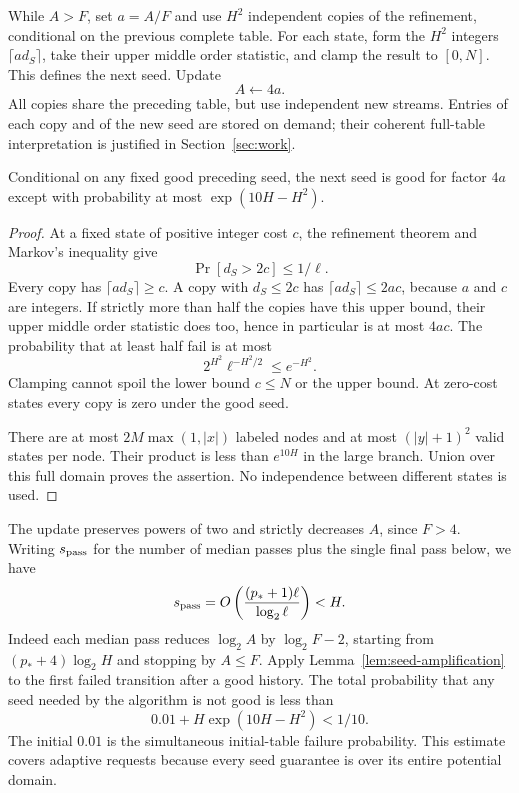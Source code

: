 While $A>F$, set $a=A/F$ and use $H^2$ independent copies of the
refinement, conditional on the previous complete table. For each state,
form the $H^2$ integers $\lceil a d_S\rceil$, take their upper middle
order statistic, and clamp the result to $[0,N]$. This defines the next
seed. Update
\begin{equation}\label{eq:seed-factor-update}
 A\longleftarrow4a.
\end{equation}
All copies share the preceding table, but use independent new streams.
Entries of each copy and of the new seed are stored on demand; their
coherent full-table interpretation is justified in Section~\ref{sec:work}.

\begin{lemma}\label{lem:seed-amplification}
Conditional on any fixed good preceding seed, the next seed is good for
factor $4a$ except with probability at most $\exp(10H-H^2)$.
\end{lemma}
\begin{proof}
At a fixed state of positive integer cost $c$, the refinement theorem and
Markov's inequality give
\[
 \Pr[d_S>2c]\le1/\ell.
\]
Every copy has $\lceil a d_S\rceil\ge c$. A copy with $d_S\le2c$ has
$\lceil a d_S\rceil\le2ac$, because $a$ and $c$ are integers. If strictly
more than half the copies have this upper bound, their upper middle order
statistic does too, hence in particular is at most $4ac$. The probability
that at least half fail is at most
\[
 2^{H^2}\ell^{-H^2/2}\le e^{-H^2}.
\]
Clamping cannot spoil the lower bound $c\le N$ or the upper bound.
At zero-cost states every copy is zero under the good seed.

There are at most $2M\max(1,|x|)$ labeled nodes and at most
$(|y|+1)^2$ valid states per node. Their product is less than $e^{10H}$
in the large branch. Union over this full domain proves the assertion.
No independence between different states is used.
\end{proof}

The update preserves powers of two and strictly decreases $A$, since
$F>4$. Writing $s_{\rm pass}$ for the number of median passes plus the
single final pass below, we have
\begin{equation}\label{eq:pass-count}
 s_{\rm pass}
 =O\left(\frac{(p_*+1)\ell}{\log_2\ell}\right)<H.
\end{equation}
Indeed each median pass reduces $\log_2 A$ by $\log_2 F-2$, starting
from $(p_*+4)\log_2 H$ and stopping by $A\le F$.
Apply Lemma~\ref{lem:seed-amplification} to the first failed transition
after a good history. The total probability that any seed needed by the
algorithm is not good is less than
\begin{equation}\label{eq:seed-total-failure}
 0.01+H\exp(10H-H^2)<1/10.
\end{equation}
The initial $0.01$ is the simultaneous initial-table failure probability.
This estimate covers adaptive requests because every seed guarantee is
over its entire potential domain.

